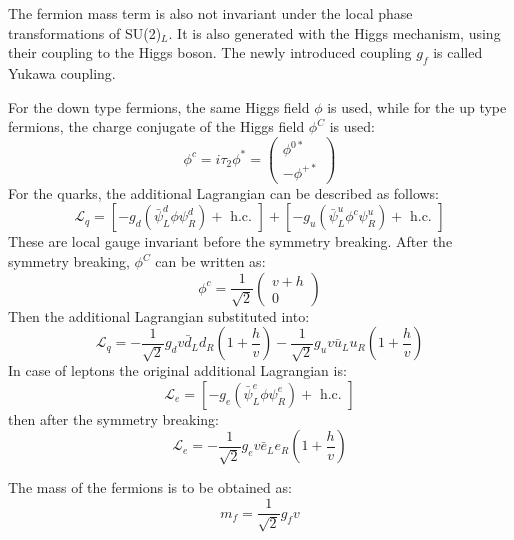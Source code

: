 The fermion mass term is also not invariant under the local phase transformations of SU(2)$_L$. It is also generated with the Higgs mechanism, using their coupling to the Higgs boson. The newly introduced coupling $g_f$ is called Yukawa coupling.

For the down type fermions, the same Higgs field $\phi$ is used, while for the up type fermions, the charge conjugate of the Higgs field $\phi^C$ is used:
\begin{equation}
\phi^{c}=i \tau_{2} \phi^{*}=\left(\begin{array}{c}
\phi^{0 *} \\
-\phi^{+*}
\end{array}\right)
\end{equation}
For the quarks, the additional Lagrangian can be described as follows:
\begin{equation}
\mathcal{L}_{q}=\left[-g_{d}\left(\bar{\psi}_{L}^{d} \phi \psi_{R}^{d}\right)+\text { h.c. }\right]+\left[-g_{u}\left(\bar{\psi}_{L}^{u} \phi^{c} \psi_{R}^{u}\right)+\text { h.c. }\right]
\end{equation}
These are local gauge invariant before the symmetry breaking. After the symmetry breaking, $\phi^C$ can be written as:
\begin{equation}
\phi^{c} 
=\frac{1}{\sqrt{2}}\left(\begin{array}{c}
v+h \\
0
\end{array}\right)
\end{equation}
Then the additional Lagrangian substituted into:
\begin{equation}
\mathcal{L}_{q}=-\frac{1}{\sqrt{2}} g_{d} v \bar{d}_{L} d_{R}\left(1+\frac{h}{v}\right)-\frac{1}{\sqrt{2}} g_{u} v \bar{u}_{L} u_{R}\left(1+\frac{h}{v}\right)
\end{equation}
In case of leptons the original additional Lagrangian is:
\begin{equation}
\mathcal{L}_{e}=\left[-g_{e}\left(\bar{\psi}_{L}^{e} \phi \psi_{R}^{e}\right)+\text { h.c. }\right]
\end{equation}
then after the symmetry breaking:
\begin{equation}
\mathcal{L}_{e}=-\frac{1}{\sqrt{2}} g_{e} v \bar{e}_{L} e_{R}\left(1+\frac{h}{v}\right)
\end{equation}

The mass of the fermions is to be obtained as:
\begin{equation}
m_{f}=\frac{1}{\sqrt{2}} g_{f} v
\end{equation}

